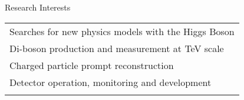 \documentclass[letterpaper,11pt,oneside]{article}
\begin{document}
 \raggedright
 \Large{Research Interests} \\
 \normalsize
 \begin{flushleft}
 \begin{tabular}{@{} l}
     Searches for new physics models with the Higgs Boson \\
     Di-boson production and measurement at TeV scale\\
     Charged particle prompt reconstruction \\
     Detector operation, monitoring and development\\
     \\
      \end{tabular}
\end{flushleft}
\end{document}
